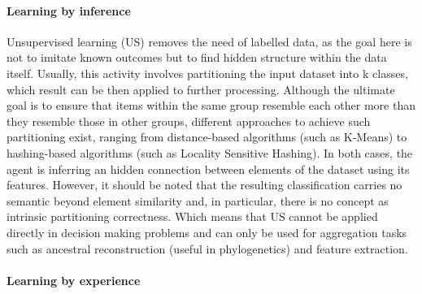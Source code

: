 \paragraph{Learning by inference}

Unsupervised learning (US) removes the need of labelled data, as the goal here is not to imitate known outcomes but to find hidden structure within the data itself.
Usually, this activity involves partitioning the input dataset into k classes, which result can be then applied to further processing.
Although the ultimate goal is to ensure that items within the same group resemble each other more than they resemble those in other groups, different approaches to achieve such partitioning exist, ranging from distance-based algorithms (such as K-Means) to hashing-based algorithms (such as Locality Sensitive Hashing).
In both cases, the agent is inferring an hidden connection between elements of the dataset using its features.
However, it should be noted that the resulting classification carries no semantic beyond element similarity and, in particular, there is no concept as intrinsic partitioning correctness. Which means that US cannot be applied directly in decision making problems and can only be used for aggregation tasks such as ancestral reconstruction (useful in phylogenetics) and feature extraction.

\paragraph{Learning by experience}


